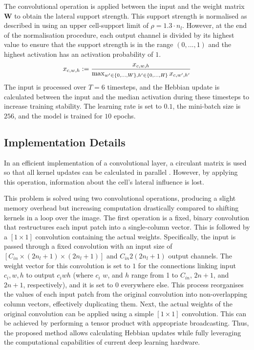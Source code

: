 The convolutional operation is applied between the input and the weight matrix $\boldsymbol{W}$ to obtain the lateral support strength.
This support strength is normalised as described in  using an upper cell-support limit of $\rho = 1.3 \cdot n_l$.
However, at the end of the normalisation procedure, each output channel is divided by its highest value to ensure that the support strength is in the range $(0, ..., 1)$ and the highest activation has an activation probability of $1$.
%
\begin{align}\eqlbl{exp_norm}
	x_{c,w,h} := \frac{x_{c,w,h}}{\max_{w' \in \{0, ..., W\}, h' \in \{0, ..., H\}} x_{c,w',h'}}
\end{align}
%
The input is processed over $T=6$ timesteps, and the Hebbian update is calculated between the input and the median activation during these timesteps to increase training stability.
The learning rate is set to $0.1$, the mini-batch size is $256$, and the model is trained for $10$ epochs.



\subsection{Implementation Details}
In an efficient implementation of a convolutional layer, a circulant matrix is used so that all kernel updates can be calculated in parallel \cite{miconi_hebbian_2021}. However, by applying this operation, information about the cell's lateral influence is lost.

This problem is solved using two convolutional operations, producing a slight memory overhead but increasing computation drastically compared to shifting kernels in a loop over the image.
The first operation is a fixed, binary convolution that restructures each input patch into a single-column vector. This is followed by a $[1\times1]$ convolution containing the actual weights. Specifically, the input is passed through a fixed convolution with an input size of $\left[C_{in} \times (2n_l+1) \times (2n_l+1)\right]$ and $C_{in} 2(2n_l+1)$ output channels. The weight vector for this convolution is set to $1$ for the connections linking input $c_i,w,h$ to output $c_iwh$ (where $c_i$ $w$, and $h$ range from 1 to $C_{in}$, $2n+1$, and $2n+1$, respectively), and it is set to 0 everywhere else. This process reorganises the values of each input patch from the original convolution into non-overlapping column vectors, effectively duplicating them. Next, the actual weights of the original convolution can be applied using a simple $[1\times1]$ convolution. This can be achieved by performing a tensor product with appropriate broadcasting.
Thus, the proposed method allows calculating Hebbian updates  while fully leveraging the computational capabilities of current deep learning hardware.







